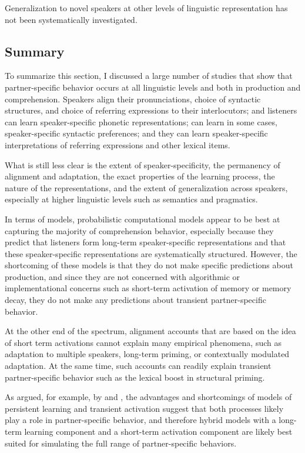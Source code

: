 Generalization to novel speakers at other levels of linguistic representation has not been systematically investigated. 

\subsection{Summary}

To summarize this section, I discussed a large number of studies that show that partner-specific behavior occurs at all linguistic levels
and both in production and comprehension. Speakers align their pronunciations, choice of syntactic structures, and choice of referring expressions
to their interlocutors; and listeners can learn speaker-specific phonetic representations; can learn in some cases, speaker-specific syntactic preferences;
and they can learn speaker-specific interpretations of referring expressions and other lexical items.

What is still less clear is the extent of speaker-specificity, the permanency of alignment and adaptation, the exact properties of the learning process, the nature of the representations, and the extent
of generalization across speakers, especially at higher linguistic levels such as semantics and pragmatics.

In terms of models, probabilistic computational models appear to be best at capturing the majority of comprehension behavior, especially
because they predict that listeners form long-term speaker-specific representations and that these speaker-specific representations are
systematically structured. However, the shortcoming of these models is that they do not make specific predictions about production, and 
since they are not concerned with algorithmic or implementational concerns \cite{Marr1982} such as short-term activation of memory or 
memory decay, they do not make any predictions about transient partner-specific behavior.

At the other end of the spectrum, alignment accounts that are based on the idea of short term activations cannot explain many 
empirical phenomena, such as adaptation to multiple speakers, long-term priming, or contextually modulated adaptation. At the same time,
such accounts can readily explain transient partner-specific behavior such as the lexical boost in structural priming.

As argued, for example, by \textcite{Ferreira2006} and \textcite{Reitter2011}, the advantages and shortcomings of models of persistent learning
and transient activation suggest that both processes likely play a role in partner-specific behavior, and therefore hybrid models with a long-term learning
component and a short-term activation component are likely best suited for simulating the full range of partner-specific behaviors.

